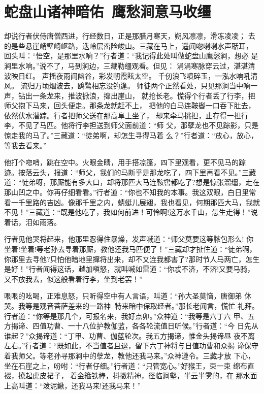 \chapter{蛇盘山诸神暗佑~鹰愁涧意马收缰}

却说行者伏侍唐僧西进，行经数日，正是那腊月寒天，朔风凛凛，滑冻凌凌；
去的是些悬崖峭壁崎岖路，迭岭层峦险峻山。三藏在马上，遥闻唿喇喇水声聒耳，
回头叫：“悟空，是那里水响？”行者道：“我记得此处叫做蛇盘山鹰愁涧，想必
是涧里水响。”说不了，马到涧边，三藏勒缰观看。但见：
涓涓寒脉穿云过，湛湛清波映日红。
声摇夜雨闻幽谷，彩发朝霞眩太空。
千仞浪飞喷碎玉，一泓水响吼清风。
流归万顷烟波去，鸥鹭相忘没钓逢。
师徒两个正然看处，只见那涧当中响一声，钻出一条龙来，推波掀浪，撺出崖山，
就抢长老。慌得个行者丢了行李，把师父抱下马来，回头便走。那条龙就赶不上，
把他的白马连鞍辔一口吞下肚去，依然伏水潜踪。行者把师父送在那高阜上坐了，
却来牵马挑担，止存得一担行李，不见了马匹。他将行李担送到师父面前道：“师
父，那孽龙也不见踪影，只是惊走我的马了。”三藏道：“徒弟啊，却怎生寻得马着
么？”行者道：“放心，放心，等我去看来。”

他打个唿哨，跳在空中。火眼金睛，用手搭凉篷，四下里观看，更不见马的踪
迹。按落云头，报道：“师父，我们的马断乎是那龙吃了，四下里再看不见。”三藏
道：“徒弟呀，那厮能有多大口，却将那匹大马连鞍辔都吃了?想是惊张溜缰，走在
那山凹之中。你再仔细看看。”行者道：“你也不知我的本事。我这双眼，白日里常
看一千里路的吉凶。像那千里之内，蜻蜓儿展翅，我也看见，何期那匹大马，我就
不见！”三藏道：“既是他吃了，我如何前进！可怜啊!这万水千山，怎生走得！”说
着话，泪如雨落。

行者见他哭将起来，他那里忍得住暴燥，发声喊道：“师父莫要这等脓包形么!
你坐着!坐着!等老孙去寻着那厮，教他还我马匹便了！”三藏却才扯住道：“徒弟啊，
你那里去寻他?只怕他暗地里撺将出来，却不又连我都害了?那时节人马两亡，怎生
是好！”行者闻得这话，越加嗔怒，就叫喊如雷道：“你忒不济，不济!又要马骑，
又不放我去，似这般看着行李，坐到老罢！”

哏哏的吆喝，正难息怒，只听得空中有人言语，叫道：“孙大圣莫恼，唐御弟
休哭。我等是观音菩萨差来的一路神，特来暗中保取经者。”那长老闻言，慌忙
礼拜。行者道：“你等是那几个，可报名来，我好点卯。”众神道：“我等是六丁六
甲、五方揭谛、四值功曹、一十八位护教伽蓝，各各轮流值日听候。”行者道：“今
日先从谁起？”众揭谛道：“丁甲、功曹、伽蓝轮次。我五方揭谛，惟金头揭谛昼
夜不离左右。”行者道：“既如此，不当值者且退，留下六丁神将与日值功曹和众揭
谛保守着我师父。等老孙寻那涧中的孽龙，教他还我马来。”众神遵令。三藏才放
下心，坐在石崖之上，吩咐：“行者仔细。”行者道：“只管宽心。”好猴王，束一束
绵布直裰，撩起虎皮裙子，着金箍铁棒，抖擞精神，径临涧壑，半云半雾的，在
那水面上高叫道：“泼泥鳅，还我马来!还我马来！”

